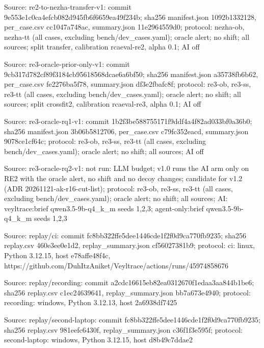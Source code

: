 \noindent Source: re2-to-nezha-transfer-v1: commit 9e553e1c0ca4efcb082d945fb6f6659ea49f234b; sha256 manifest.json 1092b1332128, per\_case.csv cc1047a748ac, summary.json 11e2964559d0; protocol: nezha-ob, nezha-tt (all cases, excluding bench/\allowbreak{}dev\_cases.yaml); oracle alert; no shift; all sources; split transfer, calibration rcaeval-re2, alpha 0.1; AI off\par
\noindent Source: re3-oracle-prior-only-v1: commit 9cb317d782cf89f3184cb95618568dcae6a6bf50; sha256 manifest.json a35738fb6b62, per\_case.csv fe2276ba5f78, summary.json df3e2fbafc8f; protocol: re3-ob, re3-ss, re3-tt (all cases, excluding bench/\allowbreak{}dev\_cases.yaml); oracle alert; no shift; all sources; split crossfit2, calibration rcaeval-re3, alpha 0.1; AI off\par
\noindent Source: re3-oracle-rq1-v1: commit 1b2f3be588755171f9ddf4a4f82ad033bf0a36b0; sha256 manifest.json 3b06b5812706, per\_case.csv c79fc352eacd, summary.json 9078ce1cf64c; protocol: re3-ob, re3-ss, re3-tt (all cases, excluding bench/\allowbreak{}dev\_cases.yaml); oracle alert; no shift; all sources; AI off\par
\noindent Source: re3-oracle-rq2-v1: not run: LLM budget; v1.0 runs the AI arm only on RE2 with the oracle alert, no shift and no decoy changes; candidate for v1.2 (ADR 20261121-ak-r16-cut-list); protocol: re3-ob, re3-ss, re3-tt (all cases, excluding bench/\allowbreak{}dev\_cases.yaml); oracle alert; no shift; all sources; AI: veyltrace:brief qwen3.5-9b-q4\_k\_m seeds 1,2,3; agent-only:brief qwen3.5-9b-q4\_k\_m seeds 1,2,3\par
\noindent Source: replay/\allowbreak{}ci: commit fc8bb322ffe5dee1446cde1f2f0d9ca770fb9235; sha256 replay.csv 460e3ee0e1d2, replay\_summary.json cf56027381b9; protocol: ci: linux, Python 3.12.15, host e78affe48f4c, https:/\allowbreak{}/\allowbreak{}github.com/\allowbreak{}DuhItzAniket/\allowbreak{}Veyltrace/\allowbreak{}actions/\allowbreak{}runs/\allowbreak{}45974858676\par
\noindent Source: replay/\allowbreak{}recording: commit a2cdc16615eb82ea0312670f1edaa3aa844b1be6; sha256 replay.csv c1ec24639641, replay\_summary.json bb7a673e4940; protocol: recording: windows, Python 3.12.13, host 2a6938df7425\par
\noindent Source: replay/\allowbreak{}second-laptop: commit fc8bb322ffe5dee1446cde1f2f0d9ca770fb9235; sha256 replay.csv 981eefc6430f, replay\_summary.json c36f1f3e595f; protocol: second-laptop: windows, Python 3.12.15, host d8b49c7ddae2\par
